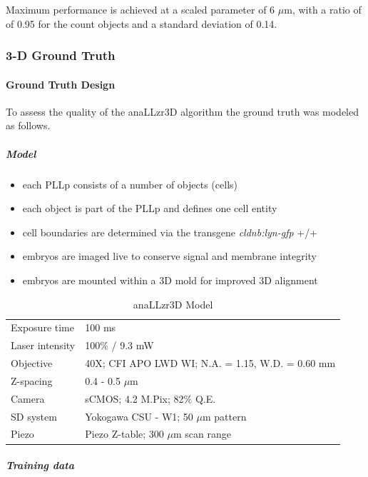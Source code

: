 \documentclass[11pt,singlespacinge,twoside]{reedthesis} %
\providecommand{\tightlist}{%
  \setlength{\itemsep}{0pt}\setlength{\parskip}{0pt}}
\begin{document}
Maximum performance is achieved at a scaled parameter of 6 \(\mu\)m, with a ratio of of 0.95 for the count objects and a standard deviation of 0.14.

\hypertarget{d-ground-truth-1}{%
\subsubsection{3-D Ground Truth}\label{d-ground-truth-1}}

\hypertarget{ground-truth-design-1}{%
\paragraph{Ground Truth Design}\label{ground-truth-design-1}}

To assess the quality of the anaLLzr3D algorithm the ground truth was modeled as follows.

\hypertarget{model-1}{%
\subparagraph{Model}\label{model-1}}
\begin{itemize}
\tightlist
\item
  each PLLp consists of a number of objects (cells)
\item
  each object is part of the PLLp and defines one cell entity
\item
  cell boundaries are determined via the transgene \emph{cldnb:lyn-gfp} +/+
\item
  embryos are imaged live to conserve signal and membrane integrity
\item
  embryos are mounted within a 3D mold for improved 3D alignment
\end{itemize}
\begin{table}[!h]

\caption{\label{tab:model3DGrT}anaLLzr3D Model}
\centering
\begin{tabu} to 
\toprule
{}  Exposure time & 100 ms\\
Laser intensity & 100$\%$ / 9.3 mW\\
  Objective & 40X; CFI APO LWD WI; N.A. = 1.15, W.D. = 0.60 mm\\
Z-spacing & 0.4 - 0.5 $\mu$m\\
  Camera & sCMOS; 4.2 M.Pix; 82$\%$ Q.E.\\
\addlinespace
SD system & Yokogawa CSU - W1; 50 $\mu$m pattern\\
  Piezo & Piezo Z-table; 300 $\mu$m scan range\\
\bottomrule
\end{tabu}
\end{table}
\hypertarget{training-data-1}{%
\subparagraph{Training data}\label{training-data-1}}
\end{document}
